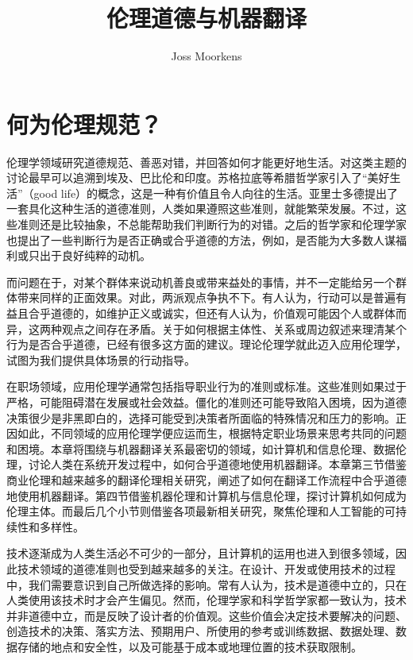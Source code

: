 \documentclass[output=paper]{langscibook}
\author{Joss Moorkens\affiliation{都柏林城市大学}}
\title{伦理道德与机器翻译}
\begin{document}
\maketitle


\section{何为伦理规范？}\label{sec:moorkens:1}

伦理学领域研究道德规范、善恶对错，并回答如何才能更好地生活。对这类主题的讨论最早可以追溯到埃及、巴比伦和印度。苏格拉底等希腊哲学家引入了“美好生活”（good life）的概念，这是一种有价值且令人向往的生活。亚里士多德提出了一套具化这种生活的道德准则，人类如果遵照这些准则，就能繁荣发展。不过，这些准则还是比较抽象，不总能帮助我们判断行为的对错。之后的哲学家和伦理学家也提出了一些判断行为是否正确或合乎道德的方法，例如，是否能为大多数人谋福利或只出于良好纯粹的动机。

而问题在于，对某个群体来说动机善良或带来益处的事情，并不一定能给另一个群体带来同样的正面效果。对此，两派观点争执不下。有人认为，行动可以是普遍有益且合乎道德的，如维护正义或诚实，但还有人认为，价值观可能因个人或群体而异，这两种观点之间存在矛盾。关于如何根据主体性、关系或周边叙述来理清某个行为是否合乎道德，已经有很多这方面的建议。理论伦理学就此迈入应用伦理学，试图为我们提供具体场景的行动指导。

在职场领域，应用伦理学通常包括指导职业行为的准则或标准。这些准则如果过于严格，可能阻碍潜在发展或社会效益。僵化的准则还可能导致陷入困境，因为道德决策很少是非黑即白的，选择可能受到决策者所面临的特殊情况和压力的影响。正因如此，不同领域的应用伦理学便应运而生，根据特定职业场景来思考共同的问题和困境。本章将围绕与机器翻译关系最密切的领域，如计算机和信息伦理、数据伦理，讨论人类在系统开发过程中，如何合乎道德地使用机器翻译。本章第三节借鉴商业伦理和越来越多的翻译伦理相关研究，阐述了如何在翻译工作流程中合乎道德地使用机器翻译。第四节借鉴机器伦理和计算机与信息伦理，探讨计算机如何成为伦理主体。而最后几个小节则借鉴各项最新相关研究，聚焦伦理和人工智能的可持续性和多样性。

技术逐渐成为人类生活必不可少的一部分，且计算机的运用也进入到很多领域，因此技术领域的道德准则也受到越来越多的关注。在设计、开发或使用技术的过程中，我们需要意识到自己所做选择的影响。常有人认为，技术是道德中立的，只在人类使用该技术时才会产生偏见。然而，伦理学家和科学哲学家都一致认为，技术并非道德中立，而是反映了设计者的价值观。这些价值会决定技术要解决的问题、创造技术的决策、落实方法、预期用户、所使用的参考或训练数据、数据处理、数据存储的地点和安全性，以及可能基于成本或地理位置的技术获取限制。
\end{document}

